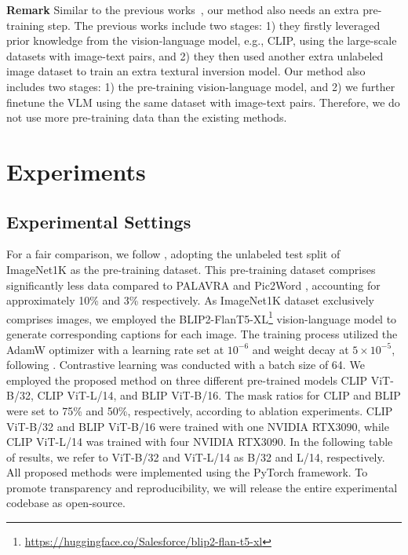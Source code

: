 \documentclass[10pt,twocolumn,letterpaper]{article}
\begin{document}
\textbf{Remark} Similar to the previous works~\cite{saito2023pic2word,Baldrati_2023_ICCV}, our method also needs an extra pre-training step. The previous works include two stages: 1) they firstly leveraged prior knowledge from the vision-language model, e.g., CLIP, using the large-scale datasets with image-text pairs, and 2) they then used another extra unlabeled image dataset to train an extra textural inversion model. Our method also includes two stages: 1) the pre-training vision-language model, and 2) we further finetune the VLM using the same dataset with image-text pairs. Therefore, we do not use more pre-training data than the existing methods.

\section{Experiments}

\subsection{Experimental Settings}
For a fair comparison, we follow \cite{Baldrati_2023_ICCV}, adopting the unlabeled test split of ImageNet1K \cite{russakovsky2015imagenet} as the pre-training dataset. This pre-training dataset comprises significantly less data compared to PALAVRA \cite{cohen2022my} and Pic2Word \cite{saito2023pic2word}, accounting for approximately 10\% and 3\% respectively. As ImageNet1K dataset exclusively comprises images, we employed the BLIP2-FlanT5-XL\footnote{\url{https://huggingface.co/Salesforce/blip2-flan-t5-xl}} vision-language model to generate corresponding captions for each image. The training process utilized the AdamW \cite{loshchilov2019decoupled} optimizer with a learning rate set at $10^{-6}$ and weight decay at $5 \times 10^{-5}$, following \cite{baldrati2022conditioned}. Contrastive learning was conducted with a batch size of 64. We employed the proposed method on three different pre-trained models CLIP ViT-B/32, CLIP ViT-L/14, and BLIP ViT-B/16. The mask ratios for CLIP and BLIP were set to 75\% and 50\%, respectively, according to ablation experiments. CLIP ViT-B/32 and BLIP ViT-B/16 were trained with one NVIDIA RTX3090, while CLIP ViT-L/14 was trained with four NVIDIA RTX3090. In the following table of results, we refer to ViT-B/32 and ViT-L/14 as B/32 and L/14, respectively. All proposed methods were implemented using the PyTorch \cite{NEURIPS2019_bdbca288} framework. To promote transparency and reproducibility, we will release the entire experimental codebase as open-source.
\end{document}
